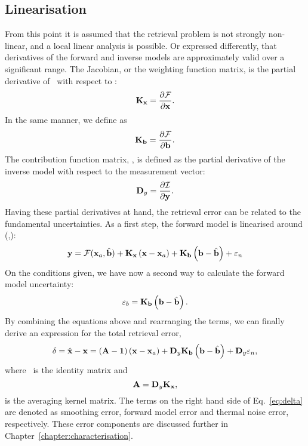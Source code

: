 \subsection{Linearisation}
%
From this point it is assumed that the retrieval problem is not strongly
non-linear, and a local linear analysis is possible. Or expressed differently,
that derivatives of the forward and inverse models are approximately valid over
a significant range. The Jacobian, or the weighting function matrix, is the
partial derivative of \FrwMdl\ with respect to \SttVct:
\begin{equation}
  \label{eq:kx}
  \mathbf{K}_{\mathbf{x}} = \frac{\partial\mathcal{F}}{\partial\mathbf{x}}.
\end{equation}
In the same manner, we define \aWfnMtr{\FrwMdlVct} as
\begin{equation}
  \label{eq:kb}
  \mathbf{K}_{\mathbf{b}} = \frac{\partial\mathcal{F}}{\partial\mathbf{b}}.
\end{equation}
The contribution function matrix, \CtrFncMtr, is defined as the partial
derivative of the inverse model with respect to the measurement vector:
\begin{equation}
  \label{eq:dy}
  \mathbf{D}_{y} = \frac{\partial\mathcal{I}}{\partial\mathbf{y}}.
\end{equation}
Having these partial derivatives at hand, the retrieval error can be related
to the fundamental uncertainties. As a first step, the forward model is
linearised around (,\FrwMdlVctHat):
\begin{equation}
  \label{eq:fmodel3}
  \mathbf{y} = \mathcal{F}(\mathbf{x}_{a},\hat{\mathbf{b}}) + 
  \mathbf{K}_{\mathbf{x}}\left(\mathbf{x}-\mathbf{x}_{a}\right) +
  \mathbf{K}_{\mathbf{b}}\left(\mathbf{b}-\hat{\mathbf{b}}\right) +
  \varepsilon_n
\end{equation}
On the conditions given, we have now a second way to calculate the forward
model uncertainty:
\begin{equation}
  \varepsilon_b = \mathbf{K}_{\mathbf{b}}\left(\mathbf{b}-\hat{\mathbf{b}}\right).
\end{equation}
By combining the equations above and rearranging the terms, we can finally
derive an expression for the total retrieval error,
\begin{equation}
  \label{eq:delta}
  \delta = \hat{\mathbf{x}} - \mathbf{x} =  \left(\mathbf{A}-\mathbf{1}\right)
    \left(\mathbf{x}-\mathbf{x}_{a}\right) + 
    \mathbf{D}_{y}\mathbf{K}_{\mathbf{b}}\left(\mathbf{b}-\hat{\mathbf{b}}\right) +
    \mathbf{D}_{y}\varepsilon_n,
\end{equation}
where \IdnMtr\ is the identity matrix and
\begin{equation}
  \label{eq:A}
  \mathbf{A} = \mathbf{D}_{y}\mathbf{K}_{\mathbf{x}},
\end{equation}
is the averaging kernel matrix. The terms on the right hand side of
Eq.~\ref{eq:delta} are denoted as smoothing error, forward model error and
thermal noise error, respectively. These error components are discussed further
in Chapter~\ref{chapter:characterisation}.


